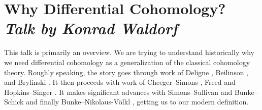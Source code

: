 \documentclass[a4paper]{book}
\theoremstyle{definition}
\theoremstyle{remark}
\numberwithin{equation}{section}
\begin{document}
\tableofcontents

\chapter{Why Differential Cohomology? \texorpdfstring{\\}{ } \normalsize \emph{Talk by Konrad Waldorf}}


This talk is primarily an overview. We are trying to understand historically why we need differential cohomology as a generalization of the classical cohomology theory. Roughly speaking, the story goes through work of Deligne \cite{deligne1971mixedhodge}, Beilinson \cite{beilinson1984regulators}, and Brylinski \cite{brylinski1993geomquant}. It then proceeds with work of Cheeger--Simons \cite{cheegersimons1985diffchar}, Freed \cite{freed2000diffcoh} and Hopkins--Singer \cite{hopkinssinger2005diffcoh}. It makes significant advances with Simons--Sullivan \cite{simonssullivan2008diffcoh} and Bunke--Schick \cite{bunkeschick2009smoothk} and finally Bunke--Nikolaus-V{\"o}lkl \cite{bunkenikolausvoelkl2016diffcoh}, getting us to our modern definition.
\end{document}
